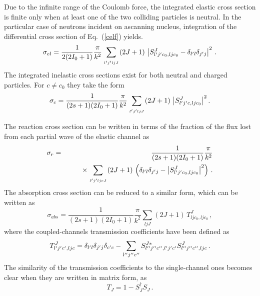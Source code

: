 Due to the infinite range of the Coulomb force, the integrated elastic cross
section is finite only when at least one of the two colliding particles is
neutral. In the particular case of neutrons incident on ascanning nucleus,
integration of the differential cross section of Eq.~(\ref{celf}) yields.
\begin{equation}
\sigma_{el}=\frac{1}{2(2I_{0}+1)}\frac{\pi}{k^{2}}\sum_{{{\atop{%
l^{\prime}j^{\prime}lj}{J}}}}(2J+1)\,\left|S_{l^{\prime}j^{%
\prime}c_{0},ljc_{0}}^{J}-\delta_{l^{\prime}l}\delta_{j^{\prime}j}%
\right|^{2}\,.
\end{equation}
The integrated inelastic cross sections exist for both neutral and charged
particles. For $c \neq c_{0}$ they take the form
\begin{equation}
\sigma_{c} =  \frac{1}{(2s+1)(2I_{0}+1)}\frac{\pi}{k^{2}}
       \sum_{{{\atop{l^{\prime}j^{\prime}lj}{J}}}}(2J+1)\,
       \left|S_{l^{\prime}j^{\prime}c,ljc_{0}}^{J}\right|^{2}.
\end{equation}

The reaction cross section can be written in terms of the fraction of the
flux lost from each partial wave of the elastic channel as
\begin{eqnarray}
\sigma_{r} & = & \frac{1}{(2s+1)(2I_{0}+1)}\frac{\pi}{k^{2}} \\
& & \qquad\times\sum_{{{\atop{l^{\prime}j^{\prime}lj}{cJ}}}%
}(2J+1)\,\left(\delta_{l^{\prime}l}\delta_{j^{\prime}j}-\left|S_{l^{%
\prime}j^{\prime}c_{0},ljc_{0}}^{J}\right|^{2}\right)\,.  \notag
\end{eqnarray}
The absorption cross section can be reduced to a similar form, which can be
written as
\begin{equation}
\sigma_{abs}=\frac{1}{(2s+1)(2I_{0}+1)}\frac{\pi}{k^{2}}\sum_{ljJ}(2J+1)\,
T_{ljc_{0},ljc_{0}}^{J}\,,
\end{equation}
where the coupled-channels transmission coefficients have been defined as
\begin{equation}
T_{l^{\prime}j^{\prime}c^{\prime},ljc}^{J}=\delta_{l^{\prime}l}\delta_{j^{%
\prime}j}\delta_{c^{\prime}c}-\sum_{l^{\prime\prime}j^{\prime\prime}c^{%
\prime\prime}}S_{l^{\prime\prime}j^{\prime\prime}c^{\prime\prime},l^{%
\prime}j^{\prime}c^{\prime}}^{J*}S_{l^{\prime\prime}j^{\prime\prime}c^{%
\prime\prime},ljc}^{J}\,.
\end{equation}
The similarity of the transmission coefficients to the single-channel ones
becomes clear when they are written in matrix form, as
\begin{equation}
T_{J}=1-S_{J}^{\dagger}S_{J}\,.
\end{equation}

